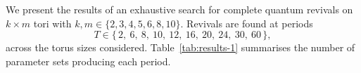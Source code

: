 We present the results of an exhaustive search for complete quantum
revivals on $k \times m$ tori with $k, m \in \{2, 3, 4, 5, 6, 8, 10\}$.
Revivals are found at periods
\begin{equation}
  T \in \{\,2,\ 6,\ 8,\ 10,\ 12,\ 16,\ 20,\ 24,\ 30,\ 60\,\},
\end{equation}
across the torus sizes considered. Table~\ref{tab:results-1} summarises
the number of parameter sets producing each period.
